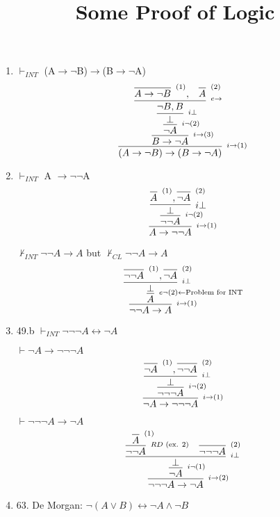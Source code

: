 \documentclass[]{article}
\title{Some Proof of Logic}
\author{}
\date{}
\def\imp{\to} %
\def\ifof{\leftrightarrow} %
\def\n{\neg}%
\begin{document}
\maketitle
\begin{enumerate}
	\item $\vdash_{INT}$ (A$\imp\neg$B)$\imp$(B$\imp\neg$A)
	$$ 
	\infer[^{i\imp (1)}]{(A\imp\neg B)\imp(B\imp\neg A)}{
	  \infer[^{i \imp (3)}]{B\imp\neg A}
	  {
	  	\infer[^{i\neg (2)}]{\neg A}
	  	{
	  	  \infer[^{i \bot}]{\bot}
	  	  {
	  	  	\infer[^{e\imp}]{\neg B, B}
	  	  	{
	  	  		\infer[^{(1)}]{A\imp\neg B}{}, & \infer[^{(2)}]{A}{}
	  	  	}
	  	  }
	  	}
	  }
	} 
	$$
	\item $\vdash_{INT}$ A $\imp\neg\neg$A 
	$$
	\infer[^{i\imp(1)}]{A\imp\neg\neg A}{
	  \infer[^{i\neg(2)}]{\neg\neg A}{
	  	\infer[i \bot]{\bot}{\infer[^{(1)}]{A}{},\infer[^{(2)}]{\neg A}{}}
	  }
	}
	$$

	$\nvdash_{INT} \neg\neg A \imp A$ but $\nvdash_{CL} \neg\neg A \imp A$
	$$
	\infer[^{i\imp(1)}]{\neg\neg A \imp A}{
	  \infer[^{e\neg(2) \gets \textrm{Problem for INT}}]{A}{
	    \infer[^{i\bot}]{\bot}{\infer[^{(1)}]{\neg\neg A}{},\infer[^{(2)}]{\neg A}{}}
  	  }
	}
	$$
	
	\item 49.b $\vdash_{INT} \neg \neg \neg A \ifof \neg A$
	
	$\vdash \neg A \imp \neg \neg \neg A$
	$$
	\infer[^{i\imp(1)}]{\neg A \imp \neg \n\n A}{
	  \infer[^{i\n(2)}]{\n\n\n A}{
	    \infer[^{i\bot}]{\bot}{
	      \infer[^{(1)}]{\n A}{}, \infer[^{(2)}]{\n\n A}{}	
	    }
	  }
	}
	$$
	
	$\vdash \n\n\n A \imp \neg A$
	$$
	\infer[^{i\imp (2)}]{\n\n\n A \imp \neg A}{
	  \infer[^{i\n(1)}]{\n A}{
	    \infer[^{i\bot}]{\bot}{
	      \infer[^{RD \textrm{ (ex. 2)}}]{\n\n A}{\infer[^{(1)}]{A}{}} & \infer[^{(2)}]{\n\n\n A}{} 
	    }	
	  }	
	}
	$$
	\pagebreak
	\item 63. De Morgan: $\n(A\lor B) \ifof \n A \land \n B$
\end{enumerate}
\end{document}
